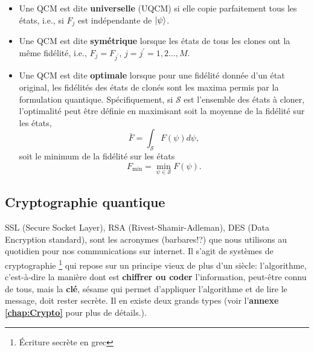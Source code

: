 \begin{itemize}
\item Une QCM est dite \textbf{universelle} (UQCM) si elle copie parfaitement
tous les états, i.e., si $F_{j}$ est indépendante de $\vert\psi\rangle$.

\item Une QCM est dite \textbf{symétrique} lorsque les états de tous les
clones ont la même fidélité, i.e., $F_{j}=F_{j^{\prime}}$, $j=j^{\prime
}=1,2\ldots,M$.

\item Une QCM est dite \textbf{optimale} lorsque pour une fidélité donnée d'un
état original, les fidélités des états de clonés sont les maxima permis par la
formulation quantique. Spécifiquement, si $\mathcal{S}$ est l'ensemble des
états à cloner, l'optimalité peut être définie en maximisant soit la moyenne
de la fidélité sur les états,%
\begin{equation}
\bar{F}=\int_{\mathcal{S}}F(\psi)d\psi,
\end{equation}
soit le minimum de la fidélité sur les états%
\begin{equation}
F_{\min}=\min_{\psi\in\mathcal{S}}F(\psi).
\end{equation}

\end{itemize}

\subsection{Cryptographie quantique}

SSL (Secure Socket Layer), RSA (Rivest-Shamir-Adleman), DES (Data Encryption
standard), sont les acronymes (barbares!?) que nous utilisons au quotidien pour
nos communications sur internet. Il s'agit de systèmes de cryptographie
\footnote{Écriture secrète en grec} qui repose sur un principe vieux de plus
d'un siècle: l'algorithme, c'est-à-dire la manière dont est \textbf{chiffrer ou
coder} l'information, peut-être connu de tous, mais la \textbf{clé}, sésame qui
permet d'appliquer l'algorithme et de lire le message, doit rester secrète. Il
en existe deux grands types (voir l'\textbf{annexe \ref{chap:Crypto}} pour plus
de détails.).

